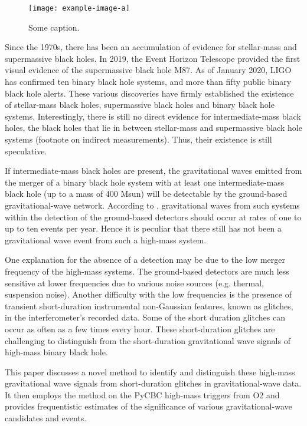 \documentclass[%
 reprint,
 amsmath,amssymb,
 aps,
]{revtex4-2}
\begin{document}
\begin{figure}
    \centering
    \texttt{[image: example-image-a]}
    \caption{Some caption.}
    \label{fig:somefig}
\end{figure}


Since the 1970s, there has been an accumulation of evidence for stellar-mass and supermassive black holes. In 2019, the Event Horizon Telescope provided the first visual evidence of the supermassive black hole M87.  As of January 2020, LIGO has confirmed ten binary black hole systems, and more than fifty public binary black hole alerts. These various discoveries have firmly established the existence of stellar-mass black holes, supermassive black holes and binary black hole systems.  Interestingly, there is still no direct evidence for intermediate-mass black holes, the black holes that lie in between stellar-mass and supermassive black hole systems (footnote on indirect measurements). Thus, their existence is still speculative. 

If intermediate-mass black holes are present, the gravitational waves emitted from the merger of a binary black hole system with at least one intermediate-mass black hole (up to a mass of 400 Msun) will be detectable by the ground-based gravitational-wave network. According to \citet{fregeau2006imbhbRatePrediction, mandel2008rates,rodriguez2015bbhRatePredictions}, gravitational waves from such systems within the detection of the ground-based detectors should occur at rates of one to up to ten events per year.  Hence it is peculiar that there still has not been a gravitational wave event from such a high-mass system. 

One explanation for the absence of a detection may be due to the low merger frequency of the high-mass systems. The ground-based detectors are much less sensitive at lower frequencies due to various noise sources (e.g. thermal, suspension noise). Another difficulty with the low frequencies is the presence of transient short-duration instrumental non-Gaussian features, known as glitches, in the interferometer's recorded data. Some of the short duration glitches can occur as often as a few times every hour. These short-duration glitches are challenging to distinguish from the short-duration gravitational wave signals of high-mass binary black hole. 

This paper discusses a novel method to identify and distinguish these high-mass gravitational wave signals from short-duration glitches in gravitational-wave data. It then employs the method on the PyCBC high-mass triggers from O2 and provides frequentistic estimates of the significance of various gravitational-wave candidates and events. 
\end{document}
